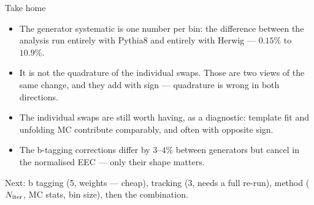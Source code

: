 \documentclass[aspectratio=169,11pt]{beamer}
\newcommand{\key}[1]{\textcolor{slate}{#1}}
\newcommand{\num}[1]{\textcolor{clay}{#1}}
\begin{document}
\begin{frame}{Take home}
\vspace{0.8em}
{\small
\begin{itemize}\itemsep0.9em
\item The generator systematic is \key{one number per bin}: the difference between the
      analysis run entirely with Pythia8 and entirely with Herwig ---
      \num{$0.15\%$} to \num{$10.9\%$}.
\item It is \key{not} the quadrature of the individual swaps. Those are two views of the
      same change, and they add with sign --- quadrature is wrong in both directions.
\item The individual swaps are still worth having, as a \key{diagnostic}: template fit and
      unfolding MC contribute comparably, and often with opposite sign.
\item The b-tagging corrections differ by $3$--$4\%$ between generators but \key{cancel}
      in the normalised EEC --- only their shape matters.
\end{itemize}
\vspace{1.2em}
\textcolor{slate}{Next:} b tagging (5, weights --- cheap), tracking (3, needs a full re-run),
method ($N_{\rm iter}$, MC stats, bin size), then the combination.
}
\end{frame}
\end{document}
